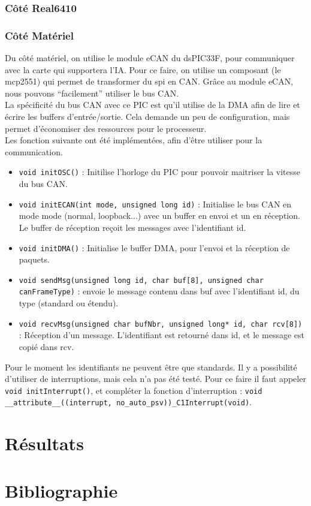 \documentclass[a4,french,12pt]{article}
\begin{document}
\subsubsection{Côté Real6410}

\subsubsection{Côté Matériel}
Du côté matériel, on utilise le module eCAN du dsPIC33F, pour communiquer avec la carte qui supportera l'IA. Pour ce faire, 
on utilise un composant (le mcp2551) qui permet de transformer du spi en CAN. Grâce au module eCAN, nous pouvons 
``facilement'' utiliser le bus CAN. \\
La spécificité du bus CAN avec ce PIC est qu'il utilise de la DMA afin de lire et écrire les buffers d'entrée/sortie. Cela 
demande un peu de configuration, mais permet d'économiser des ressources pour le processeur. \\
Les fonction suivante ont été implémentées, afin d'être utiliser pour la communication.
\begin{itemize}
\item \texttt{void initOSC()} : Initilise l'horloge du PIC pour pouvoir maitriser la vitesse du bus CAN.
\item \texttt{void initECAN(int mode, unsigned long id)} : Initialise le bus CAN en mode mode (normal, loopback...) avec un buffer 
  en envoi et un en réception. Le buffer de réception reçoit les messages avec l'identifiant id.
\item \texttt{void initDMA()} : Initialise le buffer DMA, pour l'envoi et la réception de paquets.
\item \texttt{void sendMsg(unsigned long id, char buf[8], unsigned char canFrameType)} : envoie le message contenu dans 
  buf avec l'identifiant id, du type (standard ou étendu).
\item \texttt{void recvMsg(unsigned char bufNbr, unsigned long* id, char rcv[8])} : Réception d'un message. L'identifiant 
  est retourné dans id, et le message est copié dans rcv.
\end{itemize}
Pour le moment les identifiants ne peuvent être que standards. Il y a possibilité d'utiliser de interruptions, mais cela 
n'a pas été testé. Pour ce faire il faut appeler \texttt{void initInterrupt()}, et compléter la fonction d'interruption : 
\texttt{void \_\_attribute\_\_((interrupt, no\_auto\_psv))\_C1Interrupt(void)}.

\newpage
\section{Résultats}

\newpage
\section{Bibliographie}
\end{document}
